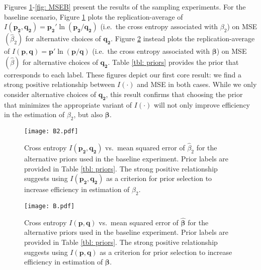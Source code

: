 \documentclass{elsarticle}
\begin{document}
Figures \ref{fig: B1}-\ref{fig: MSEB} present the results of the sampling experiments.
For the baseline scenario, Figure \ref{fig: B1} plots the replication-average of 
$I(\mathbf{p_2}, \mathbf{q_2}) = \mathbf{p_2}'\ln (\mathbf{p_2}/
\mathbf{q_2})$ (i.e.\ the cross entropy associated with $\beta_2$) on 
MSE$(\hat{\beta}_2)$  for alternative choices of $\mathbf{q_2}$.
Figure \ref{fig: B} instead plots the replication-average of 
$I(\mathbf{p}, \mathbf{q}) = \mathbf{p}'\ln (\mathbf{p}/
\mathbf{q})$ (i.e.\ the cross entropy associated with $\mathbf{\beta}$) on 
MSE$(\hat{\beta})$  for alternative choices of $\mathbf{q_2}$.
Table \ref{tbl: priors} provides the prior that corresponds to each label.
These figures depict our first core result: we find a strong positive relationship between 
$I(\cdot)$ and MSE in both cases.
While we only consider alternative choices of $\mathbf{q_2}$, this result 
confirms that choosing the prior that minimizes the appropriate variant of $I(\cdot)$ will 
not only improve efficiency in the estimation of $\beta_2$, but also $\mathbf{\beta}$.

\begin{figure}[htbp]
\centering
\texttt{[image: B2.pdf]}
\caption{Cross entropy $I(\mathbf{p_2}, \mathbf{q_2})$ vs.\  mean squared
error of $\hat{\beta}_2$ for the alternative priors used in the baseline experiment.
Prior labels are provided in Table \ref{tbl: priors}.
The strong positive relationship suggests using $I(\mathbf{p_2}, \mathbf{q_2})$
as a criterion  for prior selection to increase efficiency in estimation of 
$\beta_2$.}
\label{fig: B1}
\end{figure}

\begin{figure}[htbp]
\centering
\texttt{[image: B.pdf]}
\caption{Cross entropy $I(\mathbf{p}, \mathbf{q})$ vs.\  mean squared
error of $\mathbf{\hat{\beta}}$ for the alternative priors used in the baseline experiment.
Prior labels are provided in Table \ref{tbl: priors}.
The strong positive relationship suggests using $I(\mathbf{p}, \mathbf{q})$
as a criterion for prior selection to increase efficiency in estimation of 
$\mathbf{\beta}$.}
\label{fig: B}
\end{figure}
\end{document}
